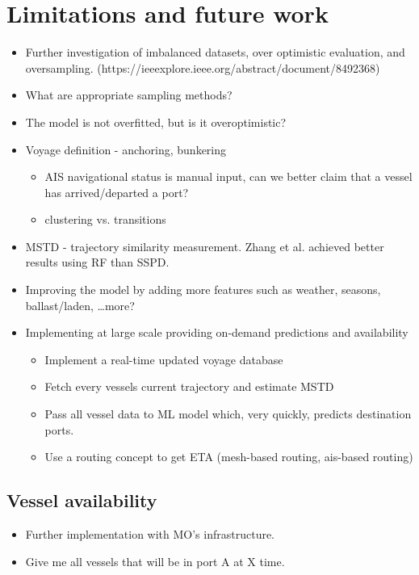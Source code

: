 \section{Limitations and future work}

\begin{itemize}
    \item Further investigation of imbalanced datasets, over optimistic evaluation, and oversampling. (https://ieeexplore.ieee.org/abstract/document/8492368)
    \item What are appropriate sampling methods?
    \item The model is not overfitted, but is it overoptimistic?
\end{itemize}

\begin{itemize}
    \item Voyage definition - anchoring, bunkering
\begin{itemize}
    \item AIS navigational status is manual input, can we better claim that a vessel has arrived/departed a port?
    \item clustering vs. transitions
\end{itemize}
    \item MSTD - trajectory similarity measurement. Zhang et al. achieved better results using RF than SSPD.
    \item Improving the model by adding more features such as weather, seasons, ballast/laden, \ldots more?
    \item Implementing at large scale providing on-demand predictions and availability
\begin{itemize}
    \item Implement a real-time updated voyage database
    \item Fetch every vessels current trajectory and estimate MSTD
    \item Pass all vessel data to ML model which, very quickly, predicts destination ports.
    \item Use a routing concept to get ETA (mesh-based routing, ais-based routing)
\end{itemize}
\end{itemize}

\subsection{Vessel availability}
\begin{itemize}
    \item Further implementation with MO's infrastructure.
    \item Give me all vessels that will be in port A at X time.
\end{itemize}
